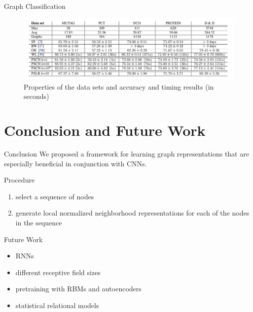 \documentclass[dvipdfmx]{beamer}
\begin{document}
  \begin{frame}{Graph Classification}
    \begin{figure}[h]
      \centering
      \includegraphics[width=0.9\paperwidth]{img/Table1.png}
      \caption{Properties of the data sets and accuracy and timing results (in seconds)}
    \end{figure} 
  \end{frame}

\section{Conclusion and Future Work}

  \begin{frame}{Conclusion}
    \alert{\Large We proposed a framework for learning graph representations that are especially beneficial in conjunction with CNNs.}
    \vspace{5mm}

    \begin{block}{Procedure}
      \begin{enumerate}
        \item select a sequence of nodes
        \item generate local normalized neighborhood representations for each of the nodes in the sequence
      \end{enumerate}
    \end{block}
  \end{frame}

  \begin{frame}{Future Work}
    \begin{itemize}
      \item RNNs
      \item different receptive field sizes
      \item pretraining with RBMs and autoencoders
      \item statistical relational models
    \end{itemize}
  \end{frame}
\end{document}
